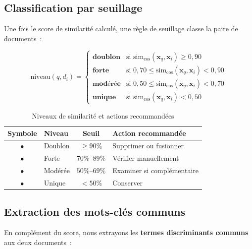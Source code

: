 \documentclass[12pt, a4paper]{article}
\begin{document}
\subsection{Classification par seuillage}

Une fois le score de similarité calculé, une règle de seuillage classe la paire de documents~:

\begin{mathbox}[title=Règle de classification]
\[
\mathrm{niveau}(q, d_i) = \begin{cases}
  \textbf{doublon}  & \text{si } \mathrm{sim}_{\cos}(\mathbf{x}_q, \mathbf{x}_i) \geq 0{,}90 \\
  \textbf{forte}    & \text{si } 0{,}70 \leq \mathrm{sim}_{\cos}(\mathbf{x}_q, \mathbf{x}_i) < 0{,}90 \\
  \textbf{modérée}  & \text{si } 0{,}50 \leq \mathrm{sim}_{\cos}(\mathbf{x}_q, \mathbf{x}_i) < 0{,}70 \\
  \textbf{unique}   & \text{si } \mathrm{sim}_{\cos}(\mathbf{x}_q, \mathbf{x}_i) < 0{,}50
\end{cases}
\]
\end{mathbox}

\begin{table}[H]
\centering
\caption{Niveaux de similarité et actions recommandées}
\begin{tabular}{clcl}
\toprule
\rowcolor{tablehead}
\color{white}\textbf{Symbole} &
\color{white}\textbf{Niveau} &
\color{white}\textbf{Seuil} &
\color{white}\textbf{Action recommandée} \\
\midrule
\rowcolor{tablegray}
{\color{red}$\bullet$} & Doublon   & $\geq 90\%$ & Supprimer ou fusionner \\
{\color{orange}$\bullet$} & Forte  & $70\%$--$89\%$ & Vérifier manuellement \\
\rowcolor{tablegray}
{\color{olive}$\bullet$} & Modérée   & $50\%$--$69\%$ & Examiner si complémentaire \\
{\color{ForestGreen}$\bullet$} & Unique & $< 50\%$ & Conserver \\
\bottomrule
\end{tabular}
\label{tab:niveaux}
\end{table}

\subsection{Extraction des mots-clés communs}

En complément du score, nous extrayons les \textbf{termes discriminants communs} aux deux documents~:
\end{document}
